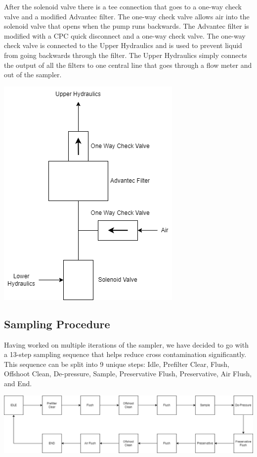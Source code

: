 \documentclass[11pt, letterpaper]{article}
\begin{document}

After the solenoid valve there is a tee connection that goes to a one-way check valve and a modified Advantec filter. The one-way check valve allows air into the solenoid valve that opens when the pump runs backwards. The Advantec filter is modified with a CPC quick disconnect and a one-way check valve. The one-way check valve is connected to the Upper Hydraulics and is used to prevent liquid from going backwards through the filter. The Upper Hydraulics simply connects the output of all the filters to one central line that goes through a flow meter and out of the sampler. 

\begin{center}
	\includegraphics[scale=0.75]{./Assets/PolyWAG_HX_HD_Filter.png}
\end{center}

\subsection{Sampling Procedure}
Having worked on multiple iterations of the sampler, we have decided to go with a 13-step sampling sequence that helps reduce cross contamination significantly. This sequence can be split into 9 unique steps: Idle, Prefilter Clear, Flush, Offshoot Clean, De-pressure, Sample, Preservative Flush, Preservative, Air Flush, and End.

\begin{center}
	\includegraphics[scale=0.45]{./Assets/Sampling Sequence.drawio.png}
\end{center}
\end{document}
